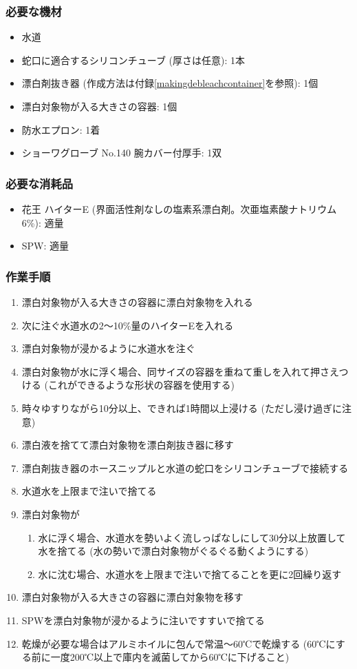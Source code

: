 \documentclass[titlepage,10pt,a4paper,uplatex]{jsbook}
\begin{document}
\subsubsection{必要な機材}
\begin{itemize}
\item 水道
\item 蛇口に適合するシリコンチューブ (厚さは任意): 1本
\item 漂白剤抜き器 (作成方法は付録\ref{makingdebleachcontainer}を参照): 1個
\item 漂白対象物が入る大きさの容器: 1個
\item 防水エプロン: 1着
\item ショーワグローブ No.140 腕カバー付厚手: 1双
\end{itemize}

\subsubsection{必要な消耗品}
\begin{itemize}
\item 花王 ハイターE (界面活性剤なしの塩素系漂白剤。次亜塩素酸ナトリウム6\%): 適量
\item SPW: 適量
\end{itemize}

\subsubsection{作業手順}
\begin{enumerate}
\item 漂白対象物が入る大きさの容器に漂白対象物を入れる
\item 次に注ぐ水道水の2～10\%量のハイターEを入れる
\item 漂白対象物が浸かるように水道水を注ぐ
\item 漂白対象物が水に浮く場合、同サイズの容器を重ねて重しを入れて押さえつける (これができるような形状の容器を使用する)
\item 時々ゆすりながら10分以上、できれば1時間以上浸ける (ただし浸け過ぎに注意)
\item 漂白液を捨てて漂白対象物を漂白剤抜き器に移す
\item 漂白剤抜き器のホースニップルと水道の蛇口をシリコンチューブで接続する
\item 水道水を上限まで注いで捨てる
\item 漂白対象物が
\begin{enumerate}
\item 水に浮く場合、水道水を勢いよく流しっぱなしにして30分以上放置して水を捨てる (水の勢いで漂白対象物がぐるぐる動くようにする)
\item 水に沈む場合、水道水を上限まで注いで捨てることを更に2回繰り返す
\end{enumerate}
\item 漂白対象物が入る大きさの容器に漂白対象物を移す
\item SPWを漂白対象物が浸かるように注いですすいで捨てる
\item 乾燥が必要な場合はアルミホイルに包んで常温～60℃で乾燥する (60℃にする前に一度200℃以上で庫内を滅菌してから60℃に下げること)
\end{enumerate}
\end{document}
